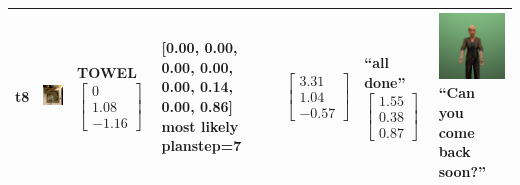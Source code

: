 \begin{longtable}{| V{0.8cm} | V{2.6cm} | V{1.6cm} | V{2.1cm} | V{1.55cm} | V{1.6cm} | V{3.2cm} |}
t8 &
\includegraphics[width=\linewidth]{fig/system/_fast2-towel2_.jpg} &
TOWEL
\linebreak\linebreak
$\begin{bmatrix}
0 \\
1.08 \\
-1.16
\end{bmatrix}$ &
[0.00, 0.00, 0.00, 0.00, 0.00, 0.14, 0.00, 0.86] most likely planstep=7 &
$\begin{bmatrix}
3.31 \\
1.04 \\
-0.57
\end{bmatrix}$ &
``all done''
\linebreak\linebreak
$\begin{bmatrix}
1.55 \\
0.38 \\
0.87
\end{bmatrix}$ &
\includegraphics[width=2.6cm]{fig/prompt/_can-you-come-back-soon_.jpg}
\linebreak
\footnotesize
``Can you come back soon?''
\\ \hline

\end{longtable}



